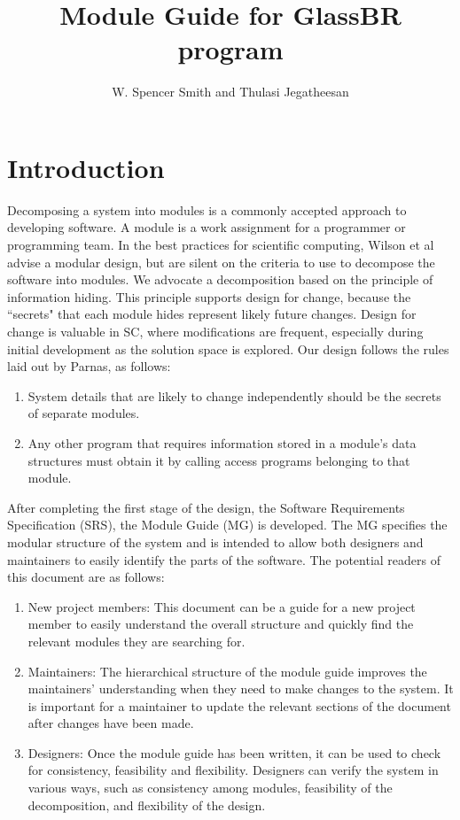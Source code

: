 \documentclass[12pt]{article}
\title{Module Guide for GlassBR program}
\author{W. Spencer Smith and Thulasi Jegatheesan}
\begin{document}
\maketitle
\tableofcontents
\newpage
\section{Introduction}
\label{Sec:Intr}
Decomposing a system into modules is a commonly accepted approach to developing software.  A module is a work assignment for a programmer or programming team. In the best practices for scientific computing, Wilson et al advise a modular design, but are silent on the criteria to use to decompose the software into modules.  We advocate a decomposition based on the principle of information hiding. This principle supports design for change, because the ``secrets" that each module hides represent likely future changes.  Design for change is valuable in SC, where modifications are frequent, especially during initial development as the solution space is explored.
Our design follows the rules laid out by Parnas, as follows:
\begin{enumerate}
\item{System details that are likely to change independently should be the secrets of separate modules.}
\item{Any other program that requires information stored in a module's data structures must obtain it by calling access programs belonging to that module.}
\end{enumerate}
After completing the first stage of the design, the Software Requirements Specification (SRS), the Module Guide (MG) is developed. The MG specifies the modular structure of the system and is intended to allow both designers and maintainers to easily identify the parts of the software.  The potential readers of this document are as follows:
\begin{enumerate}
\item{New project members: This document can be a guide for a new project member to easily understand the overall structure and quickly find the relevant modules they are searching for.}
\item{Maintainers: The hierarchical structure of the module guide improves the maintainers' understanding when they need to make changes to the system. It is important for a maintainer to update the relevant sections of the document after changes have been made.}
\item{Designers: Once the module guide has been written, it can be used to check for consistency, feasibility and flexibility. Designers can verify the system in various ways, such as consistency among modules, feasibility of the decomposition, and flexibility of the design.}
\end{enumerate}
\end{document}
